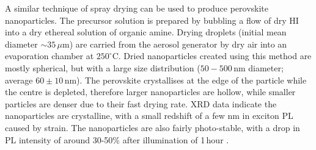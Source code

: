 A similar technique of spray drying can be used to produce perovskite nanoparticles. The precursor solution is prepared by bubbling a flow of dry HI into a dry ethereal solution of organic amine. Drying droplets (initial mean diameter $\sim 35\,\mu$m) are carried from the aerosol generator by dry air into an evaporation chamber at $250^{\circ}$C. Dried nanoparticles created using this method are mostly spherical, but with a large size distribution ($50-500$\,nm diameter; average $60\pm10$\,nm). The perovskite crystallises at the edge of the particle while the centre is depleted, therefore larger nanoparticles are hollow, while smaller particles are denser due to their fast drying rate. XRD data indicate the nanoparticles are crystalline, with a small redshift of a few nm in exciton PL caused by strain. The nanoparticles are also fairly photo-stable, with a drop in PL intensity of around 30-50\% after illumination of 1\,hour \cite{Audebert2009a}.

